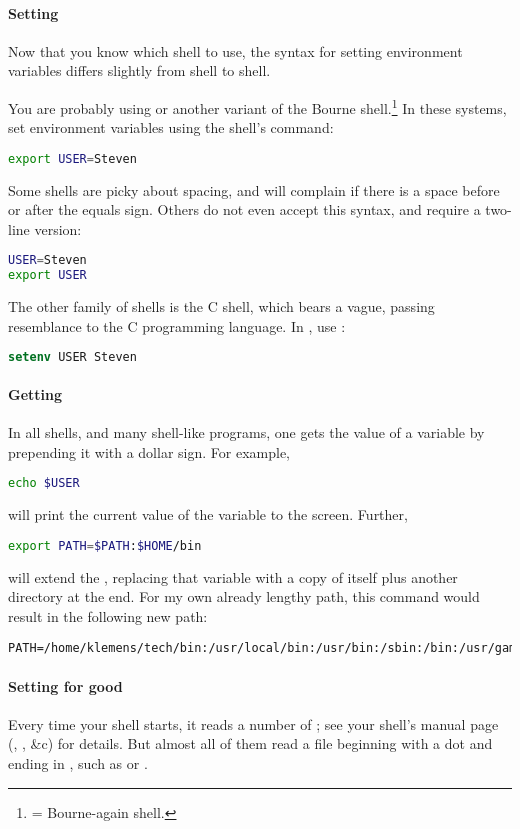 \paragraph{Setting}
Now that you know which shell to use, the syntax for setting environment
variables differs slightly from shell to shell.

You are probably using  or another variant of the Bourne
shell.\footnote{= Bourne-again shell.} In these systems,
set environment variables using the shell's  command:
\begin{lstlisting}[language=sh]
export USER=Steven
\end{lstlisting}
Some shells are picky about spacing, and will complain if
there is a space before or after the equals sign. Others do not even
accept this syntax, and require a two-line version:
\begin{lstlisting}[language=sh]
USER=Steven
export USER
\end{lstlisting}

The other family of shells is the C shell, which bears a vague, passing
resemblance to the C programming language. In , use :
\begin{lstlisting}[language=csh]
setenv USER Steven
\end{lstlisting}

\paragraph{Getting} In all shells, and many shell-like programs, one
gets the value of a variable by prepending it with a dollar sign. For
example,
\begin{lstlisting}[language=sh]
echo $USER
\end{lstlisting}
will print the current value of the  variable to the screen.
Further, 
\begin{lstlisting}[language=sh]
export PATH=$PATH:$HOME/bin
\end{lstlisting}
will extend the , replacing that variable with a copy of itself
plus another directory at the end. For my own already lengthy path, this command would result in the following new path:
\begin{lstlisting}
PATH=/home/klemens/tech/bin:/usr/local/bin:/usr/bin:/sbin:/bin:/usr/games:/sbin:/home/klemens/bin
\end{lstlisting}

\paragraph{Setting for good}
Every time your shell starts, it reads a number of ;
see your shell's manual page (, , \&c) for
details. But almost all of them read a file beginning with a dot and
ending in , such as  or . 

